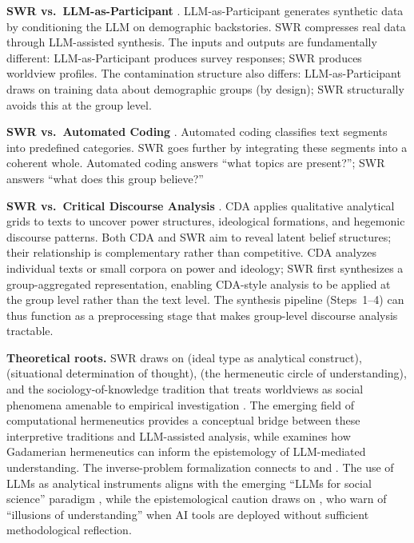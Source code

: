 \documentclass[11pt,a4paper]{article}
\begin{document}
\textbf{SWR vs.\ LLM-as-Participant} \citep{Argyle2023}. LLM-as-Participant generates synthetic data by conditioning the LLM on demographic backstories. SWR compresses real data through LLM-assisted synthesis. The inputs and outputs are fundamentally different: LLM-as-Participant produces survey responses; SWR produces worldview profiles. The contamination structure also differs: LLM-as-Participant draws on training data about demographic groups (by design); SWR structurally avoids this at the group level.

\textbf{SWR vs.\ Automated Coding} \citep{Tai2024}. Automated coding classifies text segments into predefined categories. SWR goes further by integrating these segments into a coherent whole. Automated coding answers ``what topics are present?''; SWR answers ``what does this group believe?''

\textbf{SWR vs.\ Critical Discourse Analysis} \citep[CDA;][]{Fairclough1992, Wodak2001}. CDA applies qualitative analytical grids to texts to uncover power structures, ideological formations, and hegemonic discourse patterns. Both CDA and SWR aim to reveal latent belief structures; their relationship is complementary rather than competitive. CDA analyzes individual texts or small corpora on power and ideology; SWR first synthesizes a group-aggregated representation, enabling CDA-style analysis to be applied at the group level rather than the text level. The synthesis pipeline (Steps~1--4) can thus function as a preprocessing stage that makes group-level discourse analysis tractable.

\textbf{Theoretical roots.} SWR draws on \citet{Weber1904} (ideal type as analytical construct), \citet{Mannheim1929} (situational determination of thought), \citet{Gadamer1960} (the hermeneutic circle of understanding), and the sociology-of-knowledge tradition that treats worldviews as social phenomena amenable to empirical investigation \citep{BergerLuckmann1966}. The emerging field of computational hermeneutics \citep{Kommers2026} provides a conceptual bridge between these interpretive traditions and LLM-assisted analysis, while \citet{Hornby2024} examines how Gadamerian hermeneutics can inform the epistemology of LLM-mediated understanding. The inverse-problem formalization connects to \citet{Tarantola2005} and \citet{Hadamard1923}. The use of LLMs as analytical instruments aligns with the emerging ``LLMs for social science'' paradigm \citep{Ziems2024, Bail2024}, while the epistemological caution draws on \citet{Messeri2024}, who warn of ``illusions of understanding'' when AI tools are deployed without sufficient methodological reflection.
\end{document}
